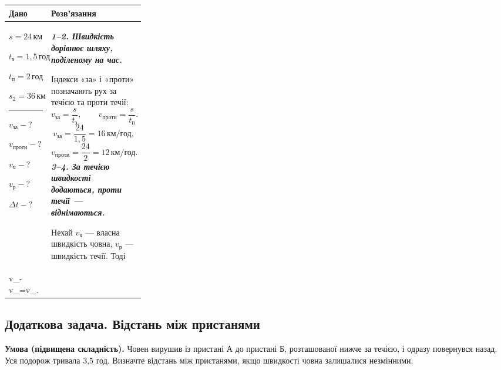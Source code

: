 \documentclass[12pt,a4paper]{article}
\newcommand{\target}[1]{\par\rule{\linewidth}{0.3pt}\par $#1-?$}
\newcommand{\why}[1]{\textbf{\textit{#1}}\par}
\newenvironment{solutiontwo}{\small\begin{tabular}{|>{\raggedright\arraybackslash}p{0.27\linewidth}|>{\raggedright\arraybackslash}p{\dimexpr0.73\linewidth-4\tabcolsep-3\arrayrulewidth\relax}|}\hline
\textbf{Дано}&\textbf{Розв'язання}\\\hline}{\\\hline\end{tabular}\par}
\begin{document}
\begin{solutiontwo}
$s=24\,\text{км}$\par
$t_{\text{з}}=1{,}5\,\text{год}$\par
$t_{\text{п}}=2\,\text{год}$\par
$s_2 =36\,\text{км}$
\target{v_{\text{за}}}\par
$v_{\text{проти}}-?$\par
$v_{\text{ч}}-?$\par
$v_{\text{р}} -?$\par
$\Delta t-?$

&

\why{1--2. Швидкість дорівнює шляху, поділеному на час.}
Індекси «за» і «проти» позначають рух за течією та проти течії:
\[v_{\text{за}}=\frac{s}{t_{\text{з}}},\qquad v_{\text{проти}}=\frac{s}{t_{\text{п}}}.\]
\[v_{\text{за}}=\frac{24}{1{,}5}=16\,\text{км/год},\]
\[v_{\text{проти}}=\frac{24}{2}=12\,\text{км/год}.\]
\why{3--4. За течією швидкості додаються, проти течії --- віднімаються.}
Нехай $v_{\text{ч}}$ --- власна швидкість човна, $v_{\text{р}} $ --- швидкість течії. Тоді
\[
\begin{cases}
v_{\text{ч}}+v_{\text{р}}=v_{\text{за}},\\
v_{\text{ч}}-v_{\text{р}}=v_{\text{проти}}.
\end{cases}
\]

Додавши рівняння, маємо $2v_{\text{ч}}=v_{\text{за}}+v_{\text{проти}}$. Віднявши друге від першого, маємо $2v_{\text{р}} =v_{\text{за}}-v_{\text{проти}}$. Отже,
\[v_{\text{ч}}=\frac{v_{\text{за}}+v_{\text{проти}}}{2}=\frac{16+12}{2}=14\,\text{км/год},\]
\[v_{\text{р}} =\frac{v_{\text{за}}-v_{\text{проти}}}{2}=\frac{16-12}{2}=2\,\text{км/год}.\]
\why{5. Знайдемо різницю часу проходження 36 км.}
\[\Delta t=\frac{s_2 }{v_{\text{проти}}}-\frac{s_2 }{v_{\text{за}}}.\]
\[\Delta t=\frac{36}{12}-\frac{36}{16}=3-2{,}25=0{,}75\,\text{год}.\]
\[\Delta t=0{,}75\cdot60=45\,\text{хв}.\]
\textbf{Відповідь:} 1) $16\,\text{км/год}$; 2) $12\,\text{км/год}$; 3) $14\,\text{км/год}$; 4) $2\,\text{км/год}$; 5) на $45\,\text{хв}$ швидше.
\end{solutiontwo}
\newpage
\subsection*{Додаткова задача. Відстань між пристанями}
\textbf{Умова (підвищена складність).} Човен вирушив із пристані А до пристані Б, розташованої нижче за течією, і одразу повернувся назад. Уся подорож тривала 3,5 год. Визначте відстань між пристанями, якщо швидкості човна залишалися незмінними.
\end{document}
